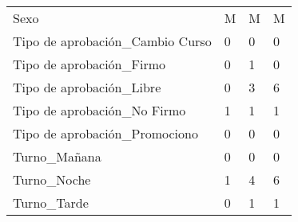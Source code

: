 \begin{longtable}[t]{llll}
Sexo & M & M & M\\
\rowcolor{gray!6}  Tipo de aprobación\_Cambio Curso & 0 & 0 & 0\\
Tipo de aprobación\_Firmo & 0 & 1 & 0\\
\addlinespace
\rowcolor{gray!6}  Tipo de aprobación\_Libre & 0 & 3 & 6\\
Tipo de aprobación\_No Firmo & 1 & 1 & 1\\
\rowcolor{gray!6}  Tipo de aprobación\_Promociono & 0 & 0 & 0\\
Turno\_Mañana & 0 & 0 & 0\\
\rowcolor{gray!6}  Turno\_Noche & 1 & 4 & 6\\
\addlinespace
Turno\_Tarde & 0 & 1 & 1\\*
\end{longtable}
\endgroup{}
